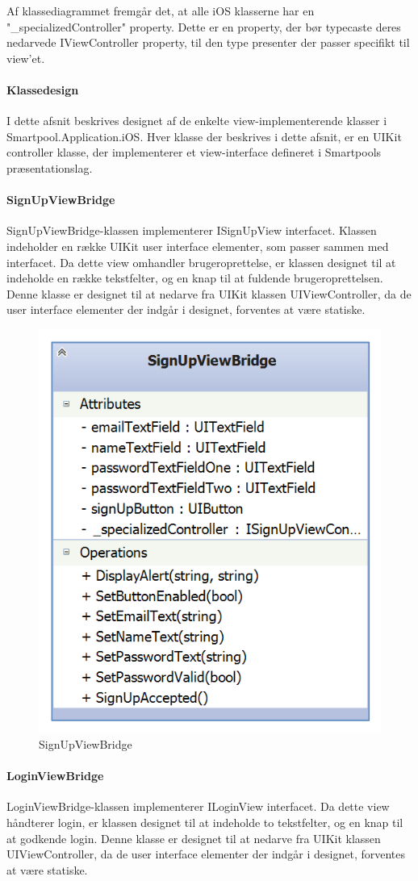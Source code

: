 Af klassediagrammet fremgår det, at alle iOS klasserne har en "\_specializedController" property. Dette er en property, der bør typecaste deres nedarvede IViewController property, til den type presenter der passer specifikt til view'et.

\paragraph{Klassedesign}
I dette afsnit beskrives designet af de enkelte view-implementerende klasser i Smartpool.Application.iOS. Hver klasse der beskrives i dette afsnit, er en UIKit controller klasse, der implementerer et view-interface defineret i Smartpools præsentationslag.

\paragraph{SignUpViewBridge}
SignUpViewBridge-klassen implementerer ISignUpView interfacet. Klassen indeholder en række UIKit user interface elementer, som passer sammen med interfacet. Da dette view omhandler brugeroprettelse, er klassen designet til at indeholde en række tekstfelter, og en knap til at fuldende brugeroprettelsen. Denne klasse er designet til at nedarve fra UIKit klassen UIViewController, da de user interface elementer der indgår i designet, forventes at være statiske.

\begin{figure}
	\centering
	\includegraphics[width=0.3\linewidth]{figs/design/ios_signupviewbridge}
	\caption{SignUpViewBridge}
	\label{fig:ios_signupviewbridge}
\end{figure}

\paragraph{LoginViewBridge}
LoginViewBridge-klassen implementerer ILoginView interfacet. Da dette view håndterer login, er klassen designet til at indeholde to tekstfelter, og en knap til at godkende login. Denne klasse er designet til at nedarve fra UIKit klassen UIViewController, da de user interface elementer der indgår i designet, forventes at være statiske.

